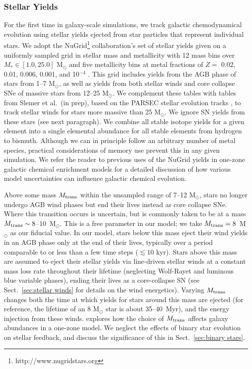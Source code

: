 \documentclass[twocolumn]{aastex61}
\begin{document}
\subsubsection{Stellar Yields}
\label{sec:yields}
For the first time in galaxy-scale simulations, we track galactic chemodynamical evolution using stellar yields ejected from star particles that represent individual stars. We adopt the NuGrid\footnote{http://www.nugridstars.org} collaboration's set of stellar yields given on a uniformly sampled grid in stellar mass and metallicity with 12 mass bins over $M_{*} \in \left[1.0, 25.0\right]$ M$_{\odot}$ and five metallicity bins at metal fractions of $Z =$ 0.02, 0.01, 0.006, 0.001, and 10$^{-4}$ \citep{Pignatari2016, Ritter2017}. This grid includes yields from the AGB phase of stars from 1--7 M$_{\odot}$, as well as yields from both stellar winds and core collapse SNe of massive stars from 12--25 M$_{\odot}$. We complement these tables with tables from Slemer et al.\ (in prep), based on the PARSEC stellar evolution tracks \citep{Bressan2012, Tang2014}, to track stellar winds for stars more massive than 25 M$_{\odot}$. We ignore SN yields from these stars (see next paragraph). We combine all stable isotope yields for a given element into a single elemental abundance for all stable elements from hydrogen to bismuth. Although we can in principle follow an arbitrary number of metal species, practical considerations of memory use prevent this in any given simulation. We refer the reader to previous uses of the NuGrid yields in one-zone galactic chemical enrichment models \citep{Cote2016,  Cote2016_feb,Cote2017} for a detailed discussion of how various model uncertainties can influence galactic chemical evolution.

%
%

Above some mass $M_{\rm trans}$ within the unsampled range of 7--12 M$_{\odot}$, stars no longer undergo AGB wind phases but end their lives instead as core collapse SNe. Where this transition occurs is uncertain, but is commonly taken to be at a mass $M_{\rm trans} \sim 8$--10~M$_{\odot}$. This is a free parameter in our model; we take $M_{\rm trans} = 8$~M$_{\odot}$ as our fiducial value. In our model, stars below this mass eject their wind yields in an AGB phase only at the end of their lives, typically over a period comparable to or less than a few time steps ($\lesssim 10$ kyr). Stars above this mass are assumed to eject their stellar yields via line-driven stellar winds at a constant mass loss rate throughout their lifetime (neglecting Wolf-Rayet and luminous blue variable phases), ending their lives as a core-collapse SN (see Sect.~\ref{sec:stellar winds} for details on the wind energetics). Varying $M_{\rm trans}$ changes both the time at which yields for stars around this mass are ejected (for reference, the lifetime of an 8 M$_{\odot}$ star is about 35--40~Myr), and the energy injection from these winds. \citet{Cote2017} explores how the choice of $M_{\rm trans}$ affects galaxy abundances in a one-zone model. We neglect the effects of binary star evolution on stellar feedback, and discuss the significance of this in Sect.~\ref{sec:binary stars}.
\end{document}

